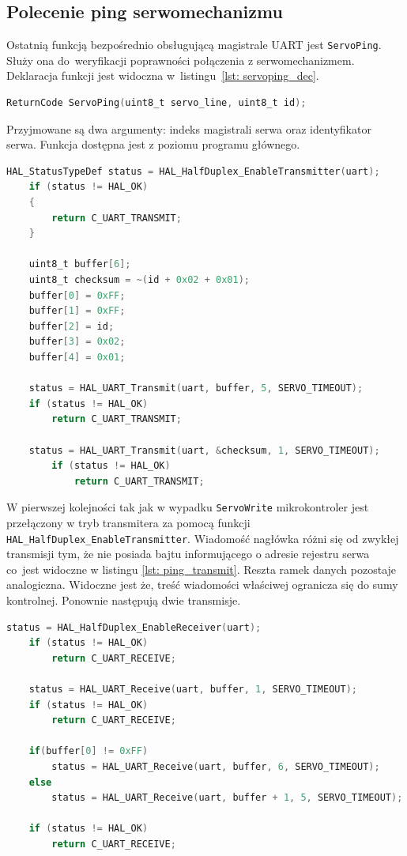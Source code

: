 \subsection{Polecenie ping serwomechanizmu}
Ostatnią funkcją bezpośrednio obsługującą magistrale UART jest \texttt{ServoPing}. Służy ona do~weryfikacji poprawności połączenia z serwomechanizmem. Deklaracja funkcji jest widoczna w~listingu~\ref{lst: servoping_dec}.
\begin{lstlisting}[language=C,
    caption={Deklaracja funkcji realizującej operację ping},
    label={lst: servoping_dec}]
    ReturnCode ServoPing(uint8_t servo_line, uint8_t id);
\end{lstlisting}
Przyjmowane są dwa argumenty: indeks magistrali serwa oraz identyfikator serwa. Funkcja dostępna jest z poziomu programu głównego.
\begin{lstlisting}[language=C,
    caption={Wiadomość zażądająca od serwomechanizmu operację ping},
    label={lst: ping_transmit}]
    HAL_StatusTypeDef status = HAL_HalfDuplex_EnableTransmitter(uart);
	if (status != HAL_OK)
	{
		return C_UART_TRANSMIT;
	}

	uint8_t buffer[6];
	uint8_t checksum = ~(id + 0x02 + 0x01);
	buffer[0] = 0xFF;
	buffer[1] = 0xFF;
	buffer[2] = id;	
	buffer[3] = 0x02;
	buffer[4] = 0x01;

	status = HAL_UART_Transmit(uart, buffer, 5, SERVO_TIMEOUT);
	if (status != HAL_OK)
		return C_UART_TRANSMIT;

	status = HAL_UART_Transmit(uart, &checksum, 1, SERVO_TIMEOUT);
		if (status != HAL_OK)
			return C_UART_TRANSMIT;
\end{lstlisting}
W pierwszej kolejności tak jak w wypadku \texttt{ServoWrite} mikrokontroler jest przełączony w tryb transmitera za pomocą funkcji \texttt{HAL\_HalfDuplex\_EnableTransmitter}. Wiadomość nagłówka różni się od zwykłej transmisji tym, że nie posiada bajtu informującego o adresie rejestru serwa co~jest widoczne w listingu \ref{lst: ping_transmit}. Reszta ramek danych pozostaje analogiczna. Widoczne jest że, treść wiadomości właściwej ogranicza się do sumy kontrolnej. Ponownie następują dwie transmisje.
\begin{lstlisting}[language=C,
    caption={Odbiór wiadomości ping},
    label={lst: ping_receive}]
    status = HAL_HalfDuplex_EnableReceiver(uart);
    if (status != HAL_OK)
        return C_UART_RECEIVE;
    
    status = HAL_UART_Receive(uart, buffer, 1, SERVO_TIMEOUT);
    if (status != HAL_OK)
        return C_UART_RECEIVE;
    
    if(buffer[0] != 0xFF)
        status = HAL_UART_Receive(uart, buffer, 6, SERVO_TIMEOUT);
    else
        status = HAL_UART_Receive(uart, buffer + 1, 5, SERVO_TIMEOUT);
    
    if (status != HAL_OK)
        return C_UART_RECEIVE;
\end{lstlisting}
